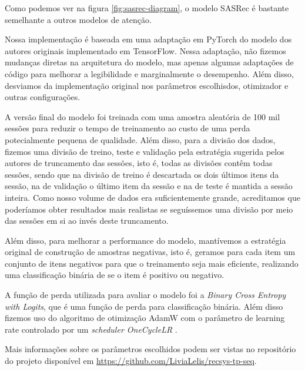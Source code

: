 Como podemos ver na figura \ref{fig:sasrec-diagram}, o modelo SASRec
é bastante semelhante a outros modelos de atenção.

Nossa implementação é baseada em uma adaptação \cite{seanswyi} em
PyTorch do modelo dos autores originais implementado em TensorFlow.
Nessa adaptação, não fizemos mudanças diretas na arquitetura do
modelo, mas apenas algumas adaptações de código para melhorar a
legibilidade e marginalmente o desempenho. Além disso, desviamos
da implementação original nos parâmetros escolhisdos, otimizador
e outras configurações.

A versão final do modelo foi treinada com uma amostra aleatória
de 100 mil sessões para reduzir o tempo de treinamento ao custo
de uma perda potecialmente pequena de qualidade. Além disso,
para a divisão dos dados, fizemos uma divisão de treino, teste
e validação pela estratégia sugerida pelos autores de truncamento
das sessões, isto é, todas as divisões contêm todas sessões,
sendo que na divisão de treino é descartada os dois últimos itens
da sessão, na de validação o último item da sessão e na de teste
é mantida a sessão inteira. Como nosso volume de dados era
suficientemente grande, acreditamos que poderíamos obter resultados
mais realistas se seguíssemos uma divisão por meio das sessões em
si ao invés deste truncamento.

Além disso, para melhorar a performance do modelo, mantívemos a
estratégia original de construção de amostras negativas, isto é,
geramos para cada item um conjunto de itens negativos para que o
treinamento seja mais eficiente, realizando uma classificação
binária de se o item é positivo ou negativo.

A função de perda utilizada para avaliar o modelo foi a 
\textit{Binary Cross Entropy with Logits}, que é uma função de perda
para classificação binária. Além disso fizemos uso do algoritmo
de otimização AdamW \cite{adamw} com o parâmetro de learning rate
controlado por um \textit{scheduler OneCycleLR} \cite{onecyclelr}.

Mais informações sobre os parâmetros escolhidos podem ser vistas
no repositório do projeto disponível em \url{https://github.com/LiviaLelis/recsys-tp-seq}.


